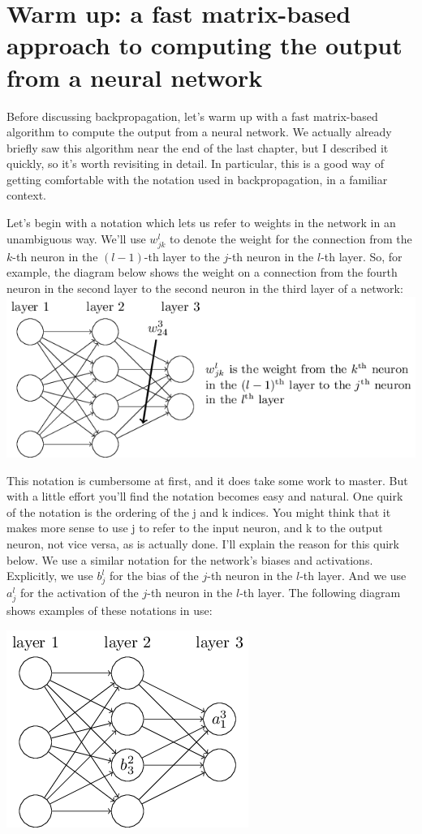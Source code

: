 \documentclass[a4paper,twoside,10pt]{book}
\begin{document}
\section{Warm up: a fast matrix-based approach to computing the output from a neural network}
Before discussing backpropagation, let's warm up with a fast matrix-based algorithm to compute the output from a neural network. We actually already briefly saw this algorithm near the end of the last chapter, but I described it quickly, so it's worth revisiting in detail. In particular, this is a good way of getting comfortable with the notation used in backpropagation, in a familiar context.

Let's begin with a notation which lets us refer to weights in the network in an unambiguous way. We'll use $w^l_{jk}$ to denote the weight for the connection from the $k$-th neuron in the $(l−1)$-th layer to the $j$-th neuron in the $l$-th layer. So, for example, the diagram below shows the weight on a connection from the fourth neuron in the second layer to the second neuron in the third layer of a network:
	\includegraphics[width=0.7\linewidth]{./figures/ch2/tikz16}

This notation is cumbersome at first, and it does take some work to master. But with a little effort you'll find the notation becomes easy and natural. One quirk of the notation is the ordering of the j and k indices. You might think that it makes more sense to use j to refer to the input neuron, and k to the output neuron, not vice versa, as is actually done. I'll explain the reason for this quirk below.
We use a similar notation for the network's biases and activations. Explicitly, we use $b^l_j$ for the bias of the $j$-th neuron in the $l$-th layer. And we use $a^l_j$ for the activation of the $j$-th neuron in the $l$-th layer. The following diagram shows examples of these notations in use:

\includegraphics[width=0.7\linewidth]{./figures/ch2/tikz17}
\end{document}
